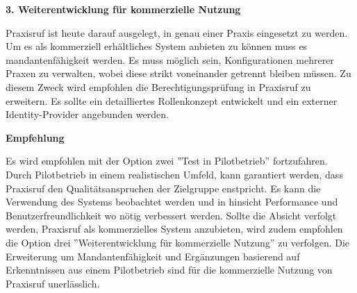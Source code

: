 \textbf{3. Weiterentwicklung für kommerzielle Nutzung}

Praxisruf ist heute darauf ausgelegt, in genau einer Praxis eingesetzt zu werden.
Um es als kommerziell erhältliches System anbieten zu können muss es mandantenfähigkeit werden.
Es muss möglich sein, Konfigurationen mehrerer Praxen zu verwalten, wobei diese strikt voneinander getrennt bleiben müssen.
Zu diesem Zweck wird empfohlen die Berechtigungsprüfung in Praxisruf zu erweitern.
Es sollte ein detailliertes Rollenkonzept entwickelt und ein externer Identity-Provider angebunden werden.

\textbf{Empfehlung}

Es wird empfohlen mit der Option zwei ''Test in Pilotbetrieb'' fortzufahren.
Durch Pilotbetrieb in einem realistischen Umfeld, kann garantiert werden, dass Praxisruf den Qualitätsanspruchen der Zielgruppe enstpricht.
Es kann die Verwendung des Systems beobachtet werden und in hinsicht Performance und Benutzerfreundlichkeit wo nötig verbessert werden.
Sollte die Absicht verfolgt werden, Praxisruf als kommerzielles System anzubieten, wird zudem empfohlen die Option drei ''Weiterentwicklung für kommerzielle Nutzung'' zu verfolgen.
Die Erweiterung um Mandantenfähigkeit und Ergänzungen basierend auf Erkenntnissen aus einem Pilotbetrieb sind für die kommerzielle Nutzung von Praxisruf unerlässlich.

\clearpage
